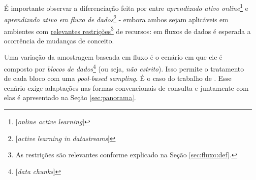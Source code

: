É importante observar a diferenciação feita por \cite{zliobaite2011active} entre
\textit{aprendizado ativo online}\footnote{[\textit{online active learning}]
}
 e \textit{aprendizado ativo em fluxo de dados}\footnote{[\textit{active learning in
datastreams}]
}
- embora ambos sejam aplicáveis em ambientes com
\underline{relevantes restrições}\footnote{As restrições são relevantes conforme explicado na
Seção
\ref{sec:fluxo:def}.
} de recursos:
em fluxos de dados é esperada a ocorrência de mudanças de conceito.

Uma variação da amostragem baseada em fluxo
é o cenário em que ele é composto por \textit{blocos de dados}\footnote{[\textit{data chunks}]
} (ou seja, \textit{não estrito}).
Isso permite o tratamento de cada bloco com uma \textit{pool-based sampling}.
É o caso do trabalho de \cite{zhu2007active}.
Esse cenário exige adaptações nas formas convencionais de consulta e juntamente com elas é
apresentado na Seção \ref{sec:panorama}.